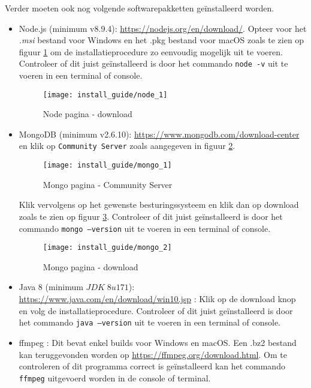Verder moeten ook nog volgende softwarepakketten ge\"installeerd worden.
\begin{itemize}
\item Node.js (minimum v8.9.4): \url{https://nodejs.org/en/download/}. Opteer voor het 
\textit{.msi} bestand voor Windows en het .pkg bestand voor macOS zoals te zien op figuur \ref{fig:node_1} om de installatieprocedure zo eenvoudig 
mogelijk uit te voeren. Controleer of dit juist ge\"installeerd is door het commando \texttt{node -v} uit te voeren in een terminal of console.
\begin{figure}[ht]
        \centering
 \texttt{[image: install\_guide/node\_1]}
 \caption{Node pagina - download}
 \label{fig:node_1}

\end{figure}
\item MongoDB (minimum v2.6.10): \url{https://www.mongodb.com/download-center} 
en klik op \texttt{Community Server} zoals aangegeven in figuur \ref{fig:mongo_1}.
\begin{figure}[ht]
\centering
 \texttt{[image: install\_guide/mongo\_1]}
 \caption{Mongo pagina - Community Server}
 \label{fig:mongo_1}
\end{figure}
Klik vervolgens op het gewenste besturingssysteem en klik dan op download zoals te zien op figuur \ref{fig:mongo_2}. Controleer of dit juist ge\"installeerd is door het commando \texttt{mongo  --version} uit te voeren in een terminal of console.
\begin{figure}[ht]
\centering
 \texttt{[image: install\_guide/mongo\_2]}
 \caption{Mongo pagina - download}
 \label{fig:mongo_2}
\end{figure}

    \item Java 8 (minimum $JDK\;8u171$): \url{https://www.java.com/en/download/win10.jsp} : Klik op de download knop en volg de installatieprocedure. Controleer of dit juist ge\"installeerd is door het commando \texttt{java --version} uit te voeren in een terminal of console.
    
    \item ffmpeg : Dit bevat enkel builds voor Windows en macOS. Een .bz2 bestand kan teruggevonden worden op \url{https://ffmpeg.org/download.html}. Om te controleren of dit programma correct is geïnstalleerd kan het commando \texttt{ffmpeg} uitgevoerd worden in de console of terminal.

\end{itemize}

